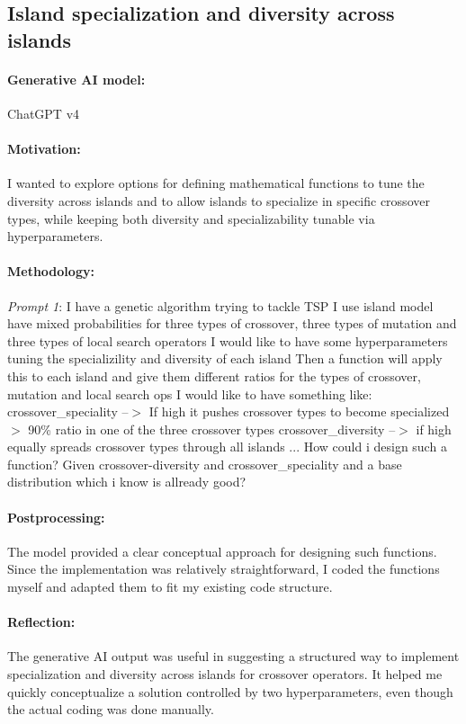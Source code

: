 \documentclass[a4paper,10pt]{article} %
\begin{document}
\subsection{Island specialization and diversity across islands} 
\paragraph{Generative AI model:} ChatGPT v4
\paragraph{Motivation:} 
I wanted to explore options for defining mathematical functions to tune the diversity across islands and to allow islands to specialize in specific crossover types, while keeping both diversity and specializability tunable via hyperparameters.

\paragraph{Methodology:} 
\textit{Prompt 1}:
I have a genetic algorithm trying to tackle TSP I use island model have mixed probabilities for three types of crossover, three types of mutation and three types of local search operators I would like to have some hyperparameters tuning the specializility and diversity of each island Then a function will apply this to each island and give them different ratios for the types of crossover, mutation and local search ops I would like to have something like: crossover\_speciality --$>$ If high it pushes crossover types to become specialized $>$ 90\% ratio in one of the three crossover types crossover\_diversity --$>$ if high equally spreads crossover types through all islands ... How could i design such a function? Given crossover-diversity and crossover\_speciality and a base distribution which i know is allready good?


\paragraph{Postprocessing:} 
The model provided a clear conceptual approach for designing such functions. Since the implementation was relatively straightforward, I coded the functions myself and adapted them to fit my existing code structure.

\paragraph{Reflection:} 
The generative AI output was useful in suggesting a structured way to implement specialization and diversity across islands for crossover operators. It helped me quickly conceptualize a solution controlled by two hyperparameters, even though the actual coding was done manually.
\end{document}
